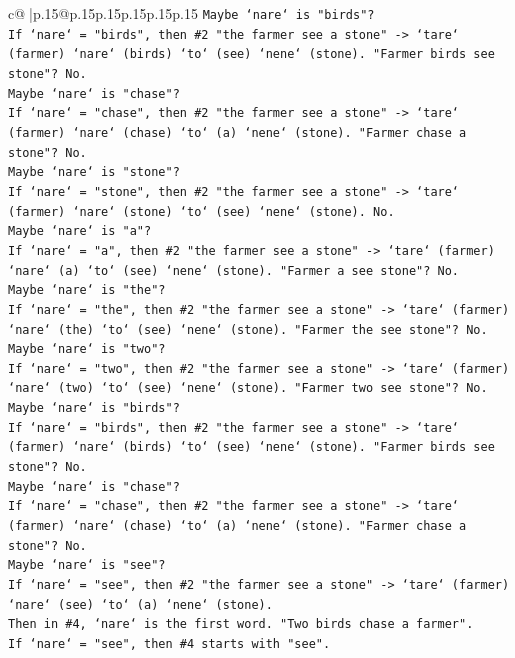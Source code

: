 \documentclass{article}
\begin{document}
{\begin{supertabular}{c@{$\;$}|p{.15\linewidth}@{}p{.15\linewidth}p{.15\linewidth}p{.15\linewidth}p{.15\linewidth}p{.15\linewidth}}
{{{\texttt{Maybe `nare` is "birds"?} \\
\texttt{If `nare` = "birds", then \#2 "the farmer see a stone" {-}> `tare` (farmer) `nare` (birds) `to` (see) `nene` (stone). "Farmer birds see stone"? No.} \\
\texttt{Maybe `nare` is "chase"?} \\
\texttt{If `nare` = "chase", then \#2 "the farmer see a stone" {-}> `tare` (farmer) `nare` (chase) `to` (a) `nene` (stone). "Farmer chase a stone"? No.} \\
\texttt{Maybe `nare` is "stone"?} \\
\texttt{If `nare` = "stone", then \#2 "the farmer see a stone" {-}> `tare` (farmer) `nare` (stone) `to` (see) `nene` (stone). No.} \\
\texttt{Maybe `nare` is "a"?} \\
\texttt{If `nare` = "a", then \#2 "the farmer see a stone" {-}> `tare` (farmer) `nare` (a) `to` (see) `nene` (stone). "Farmer a see stone"? No.} \\
\texttt{Maybe `nare` is "the"?} \\
\texttt{If `nare` = "the", then \#2 "the farmer see a stone" {-}> `tare` (farmer) `nare` (the) `to` (see) `nene` (stone). "Farmer the see stone"? No.} \\
\texttt{Maybe `nare` is "two"?} \\
\texttt{If `nare` = "two", then \#2 "the farmer see a stone" {-}> `tare` (farmer) `nare` (two) `to` (see) `nene` (stone). "Farmer two see stone"? No.} \\
\texttt{Maybe `nare` is "birds"?} \\
\texttt{If `nare` = "birds", then \#2 "the farmer see a stone" {-}> `tare` (farmer) `nare` (birds) `to` (see) `nene` (stone). "Farmer birds see stone"? No.} \\
\texttt{Maybe `nare` is "chase"?} \\
\texttt{If `nare` = "chase", then \#2 "the farmer see a stone" {-}> `tare` (farmer) `nare` (chase) `to` (a) `nene` (stone). "Farmer chase a stone"? No.} \\
\texttt{Maybe `nare` is "see"?} \\
\texttt{If `nare` = "see", then \#2 "the farmer see a stone" {-}> `tare` (farmer) `nare` (see) `to` (a) `nene` (stone).} \\
\texttt{Then in \#4, `nare` is the first word. "Two birds chase a farmer".} \\
\texttt{If `nare` = "see", then \#4 starts with "see".} \\
}}}
\end{supertabular}}
\end{document}
